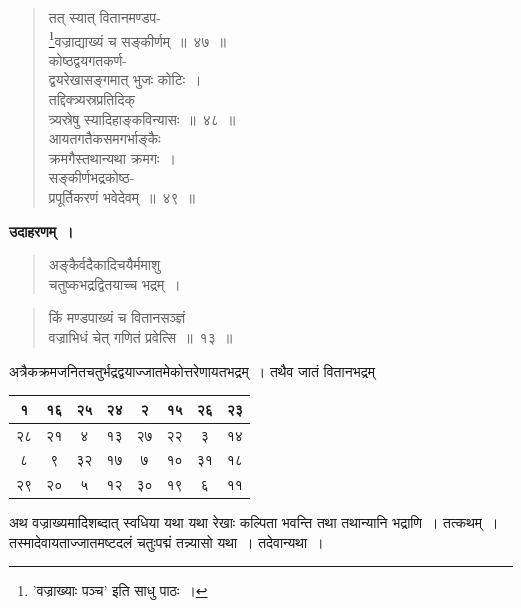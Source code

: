 \documentclass[11pt, openany]{book}
\begin{document}
\newpage

\begin{quote}
{\gk तत् स्यात् वितानमण्डप-\\
\renewcommand{\thefootnote}{१}\footnote{'वज्राख्याः पञ्च' इति साधु पाठः~।}वज्राद्याख्यं च सङ्कीर्णम्~॥~४७~॥\\
कोष्ठद्वयगतकर्ण-\\
द्वयरेखासङ्गमात् भुजः कोटिः~।\\
तद्दिक्त्र्यस्रप्रतिदिक्\\
त्र्यस्रेषु स्यादिहाङ्कविन्यासः~॥~४८~॥\\
आयतगतैकसमगर्भाङ्कैः\\
क्रमगैस्तथान्यथा क्रमगः~।\\
सङ्कीर्णभद्रकोष्ठ-\\
प्रपूर्तिकरणं भवेदेवम्~॥~४९~॥	}
\end{quote}

\textbf{उदाहरणम्~।}
\begin{quote}
{\ex अङ्कैर्वदैकादिचयैर्ममाशु\\
चतुष्कभद्रद्वितयाच्च भद्रम्~।}	
\end{quote}

\newpage

\begin{quote}
{\ex किं मण्डपाख्यं च वितानसञ्ज्ञं\\
वज्राभिधं चेत् गणितं प्रवेत्सि~॥~१३~॥}	
\end{quote}

अत्रैकक्रमजनितचतुर्भद्रद्वयाज्जातमेकोत्तरेणायतभद्रम्~। तथैव जातं वितानभद्रम्\textendash

\begin{center}
\begin{tabular}{|c|c|c|c|c|c|c|c|}
	\hline
	१ & १६ & २५ & २४ & २ & १५ & २६ & २३\\
	\hline
	२८ & २१ & ४ & १३ & २७ & २२ & ३ & १४\\
	\hline
	८ & ९ & ३२ & १७ & ७ & १० & ३१ & १८\\
	\hline
	२९ & २० & ५ & १२ & ३० & १९  & ६ & ११ \\
	\hline
\end{tabular}
\end{center}	

अथ वज्राख्यमादिशब्दात् स्वधिया यथा यथा रेखाः कल्पिता भवन्ति तथा तथान्यानि भद्राणि~। तत्कथम्~। तस्मादेवायताज्जातमष्टदलं चतुःपद्मं तन्न्यासो यथा~। तदेवान्यथा~।
\vspace{-6mm}
\end{document}
